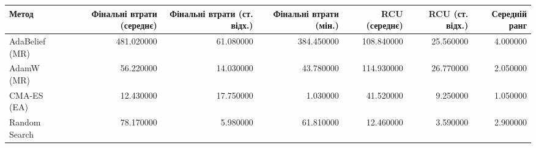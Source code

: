 \begin{tabular}{lrrrrrr}
\toprule
Метод & Фінальні втрати (середнє) & Фінальні втрати (ст. відх.) & Фінальні втрати (мін.) & RCU (середнє) & RCU (ст. відх.) & Середній ранг \\
\midrule
AdaBelief (MR) & 481.020000 & 61.080000 & 384.450000 & 108.840000 & 25.560000 & 4.000000 \\
AdamW (MR) & 56.220000 & 14.030000 & 43.780000 & 114.930000 & 26.770000 & 2.050000 \\
CMA-ES (EA) & 12.430000 & 17.750000 & 1.030000 & 41.520000 & 9.250000 & 1.050000 \\
Random Search & 78.170000 & 5.980000 & 61.810000 & 12.460000 & 3.590000 & 2.900000 \\
\bottomrule
\end{tabular}
